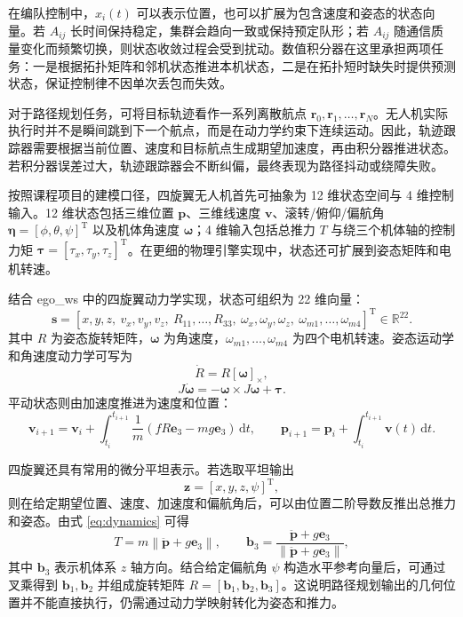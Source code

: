 \documentclass[UTF8,zihao=-4]{ctexart}
\newcommand{\diff}{\mathrm{d}}
\begin{document}
在编队控制中，$x_i(t)$ 可以表示位置，也可以扩展为包含速度和姿态的状态向量。若 $A_{ij}$ 长时间保持稳定，集群会趋向一致或保持预定队形；若 $A_{ij}$ 随通信质量变化而频繁切换，则状态收敛过程会受到扰动。数值积分器在这里承担两项任务：一是根据拓扑矩阵和邻机状态推进本机状态，二是在拓扑短时缺失时提供预测状态，保证控制律不因单次丢包而失效。

对于路径规划任务，可将目标轨迹看作一系列离散航点 $\bm r_0,\bm r_1,\ldots,\bm r_N$。无人机实际执行时并不是瞬间跳到下一个航点，而是在动力学约束下连续运动。因此，轨迹跟踪器需要根据当前位置、速度和目标航点生成期望加速度，再由积分器推进状态。若积分器误差过大，轨迹跟踪器会不断纠偏，最终表现为路径抖动或绕障失败。

按照课程项目的建模口径，四旋翼无人机首先可抽象为 12 维状态空间与 4 维控制输入。12 维状态包括三维位置 $\bm p$、三维线速度 $\bm v$、滚转/俯仰/偏航角 $\bm\eta=[\phi,\theta,\psi]^{\mathrm T}$ 以及机体角速度 $\bm\omega$；4 维输入包括总推力 $T$ 与绕三个机体轴的控制力矩 $\bm\tau=[\tau_x,\tau_y,\tau_z]^{\mathrm T}$。在更细的物理引擎实现中，状态还可扩展到姿态矩阵和电机转速。

结合 ego\_ws 中的四旋翼动力学实现，状态可组织为 22 维向量：
\begin{equation}
  \bm s=
  [x,y,z,\ v_x,v_y,v_z,\ R_{11},\ldots,R_{33},\ \omega_x,\omega_y,\omega_z,\ \omega_{m1},\ldots,\omega_{m4}]^{\mathrm T}
  \in\mathbb{R}^{22}.
  \label{eq:state-22}
\end{equation}
其中 $R$ 为姿态旋转矩阵，$\bm\omega$ 为角速度，$\omega_{m1},\ldots,\omega_{m4}$ 为四个电机转速。姿态运动学和角速度动力学可写为
\begin{equation}
  \dot R=R[\bm\omega]_\times,
  \label{eq:so3-kinematics}
\end{equation}
\begin{equation}
  J\dot{\bm\omega}=-\bm\omega\times J\bm\omega+\bm\tau.
  \label{eq:angular-dynamics}
\end{equation}
平动状态则由加速度推进为速度和位置：
\begin{equation}
  \bm v_{i+1}=\bm v_i+\int_{t_i}^{t_{i+1}}\frac{1}{m}(fR\bm e_3-mg\bm e_3)\,\diff t,\qquad
  \bm p_{i+1}=\bm p_i+\int_{t_i}^{t_{i+1}}\bm v(t)\,\diff t.
  \label{eq:pv-integral}
\end{equation}

四旋翼还具有常用的微分平坦表示。若选取平坦输出
\begin{equation}
  \bm z=[x,y,z,\psi]^{\mathrm T},
  \label{eq:flat-output}
\end{equation}
则在给定期望位置、速度、加速度和偏航角后，可以由位置二阶导数反推出总推力和姿态。由式 \eqref{eq:dynamics} 可得
\begin{equation}
  T=m\left\|\ddot{\bm p}+g\bm e_3\right\|,\qquad
  \bm b_3=\frac{\ddot{\bm p}+g\bm e_3}{\left\|\ddot{\bm p}+g\bm e_3\right\|},
  \label{eq:flat-thrust}
\end{equation}
其中 $\bm b_3$ 表示机体系 $z$ 轴方向。结合给定偏航角 $\psi$ 构造水平参考向量后，可通过叉乘得到 $\bm b_1,\bm b_2$ 并组成旋转矩阵 $R=[\bm b_1,\bm b_2,\bm b_3]$。这说明路径规划输出的几何位置并不能直接执行，仍需通过动力学映射转化为姿态和推力。
\end{document}
